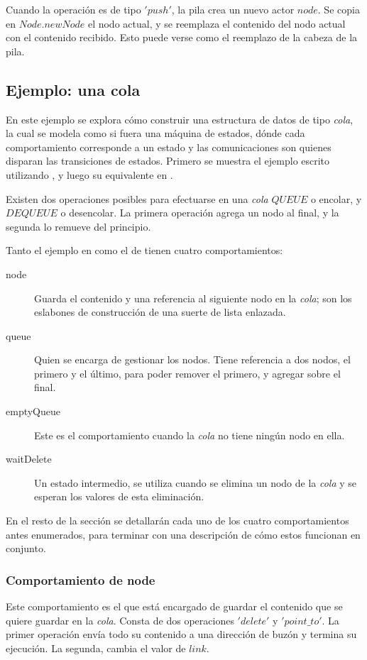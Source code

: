 Cuando la operación es de tipo $'push'$, la pila crea un nuevo actor $node$. Se copia en $Node.newNode$ el nodo actual, y se reemplaza el contenido del nodo actual con el contenido recibido. Esto puede verse como el reemplazo de la cabeza de la pila.

\subsection{Ejemplo: una cola}\label{ejemplo:cola}

En este ejemplo se explora cómo construir una estructura de datos de tipo \textit{cola}, la cual se modela como si fuera una máquina de estados, dónde cada comportamiento corresponde a un estado y las comunicaciones son quienes disparan las transiciones de estados. Primero se muestra el ejemplo escrito utilizando \SAL, y luego su equivalente en \CSP.

Existen dos operaciones posibles para efectuarse en una \textit{cola} $QUEUE$ o encolar, y $DEQUEUE$ o desencolar. La primera operación agrega un nodo al final, y la segunda lo remueve del principio. 

Tanto el ejemplo en \SAL como el de \CSP tienen cuatro comportamientos:

\begin{description}
 \item [node] Guarda el contenido y una referencia al siguiente nodo en la \textit{cola}; son los eslabones de construcción de una suerte de lista enlazada.
 \item [queue] Quien se encarga de gestionar los nodos. Tiene referencia a dos nodos, el primero y el último, para poder remover el primero, y agregar sobre el final.
 \item [emptyQueue] Este es el comportamiento cuando la \textit{cola} no tiene ningún nodo en ella.
 \item [waitDelete] Un estado intermedio, se utiliza cuando se elimina un nodo de la \textit{cola} y se esperan los valores de esta eliminación.
\end{description}

En el resto de la sección se detallarán cada uno de los cuatro comportamientos antes enumerados, para terminar con una descripción de cómo estos funcionan en conjunto.

\subsubsection*{Comportamiento de node}
Este comportamiento es el que está encargado de guardar el contenido que se quiere guardar en la \textit{cola}. Consta de dos operaciones $'delete'$ y $'point\_to'$. La primer operación envía todo su contenido a una dirección de buzón y termina su ejecución. La segunda, cambia el valor de $link$.

